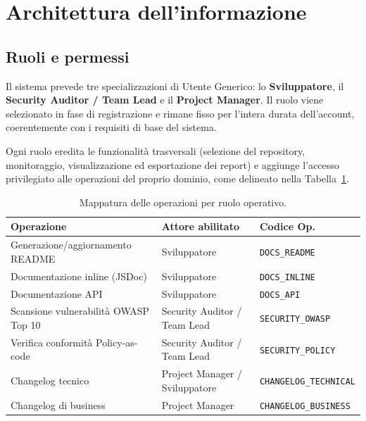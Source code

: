 \documentclass[11pt,a4paper]{article}
\begin{document}
\section{Architettura dell'informazione}

\subsection{Ruoli e permessi}

Il sistema prevede tre specializzazioni di Utente Generico: lo \textbf{Sviluppatore}, il \textbf{Security Auditor / Team Lead} e il \textbf{Project Manager}. Il ruolo viene selezionato in fase di registrazione e rimane fisso per l'intera durata dell'account, coerentemente con i requisiti di base del sistema.

Ogni ruolo eredita le funzionalità trasversali (selezione del repository, monitoraggio, visualizzazione ed esportazione dei report) e aggiunge l'accesso privilegiato alle operazioni del proprio dominio, come delineato nella Tabella~\ref{tab:fe-ruoli-operazioni}.

\begin{table}[H]
\centering
\caption{Mappatura delle operazioni per ruolo operativo.}
\label{tab:fe-ruoli-operazioni}
\vspace{2mm}
\renewcommand{\arraystretch}{1.2}
\begin{tabularx}{\textwidth}{|X|X|l|}
\hline
\textbf{Operazione} & \textbf{Attore abilitato} & \textbf{Codice Op.} \\ \hline
Generazione/aggiornamento README & Sviluppatore & \texttt{DOCS\_README} \\ \hline
Documentazione inline (JSDoc) & Sviluppatore & \texttt{DOCS\_INLINE} \\ \hline
Documentazione API & Sviluppatore & \texttt{DOCS\_API} \\ \hline
Scansione vulnerabilità OWASP Top 10 & Security Auditor / Team Lead & \texttt{SECURITY\_OWASP} \\ \hline
Verifica conformità Policy-as-code & Security Auditor / Team Lead & \texttt{SECURITY\_POLICY} \\ \hline
Changelog tecnico & Project Manager / Sviluppatore & \texttt{CHANGELOG\_TECHNICAL} \\ \hline
Changelog di business & Project Manager & \texttt{CHANGELOG\_BUSINESS} \\ \hline
\end{tabularx}
\end{table}
\end{document}

